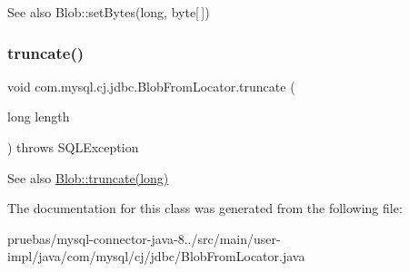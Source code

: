 \begin{DoxySeeAlso}{See also}
Blob\+::set\+Bytes(long, byte\mbox{[}$\,$\mbox{]}) 
\end{DoxySeeAlso}
\mbox{\label{classcom_1_1mysql_1_1cj_1_1jdbc_1_1_blob_from_locator_aa3292b305786ffdcaf63ccaab6ff620b}} 
\subsubsection{\texorpdfstring{truncate()}{truncate()}}
{\footnotesize\ttfamily void com.\+mysql.\+cj.\+jdbc.\+Blob\+From\+Locator.\+truncate (\begin{DoxyParamCaption}\item[{long}]{length }\end{DoxyParamCaption}) throws S\+Q\+L\+Exception}

\begin{DoxySeeAlso}{See also}
\mbox{\hyperlink{classcom_1_1mysql_1_1cj_1_1jdbc_1_1_blob_a423c316889dc06f59cbaee6f77c6401f}{Blob\+::truncate(long)}} 
\end{DoxySeeAlso}


The documentation for this class was generated from the following file\+:\begin{DoxyCompactItemize}
\item 
pruebas/mysql-\/connector-\/java-\/8../src/main/user-\/impl/java/com/mysql/cj/jdbc/Blob\+From\+Locator.\+java\end{DoxyCompactItemize}
